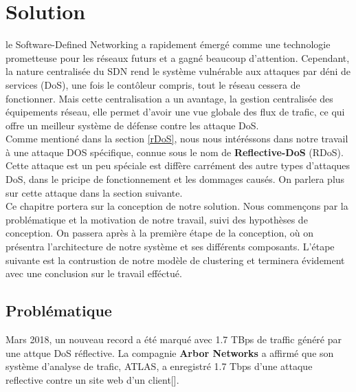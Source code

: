 \chapter{Solution}

\label{Chapter4} 
le Software-Defined Networking a rapidement émergé comme une technologie prometteuse pour les réseaux futurs et a gagné beaucoup d'attention. Cependant, la nature centralisée du SDN rend le système vulnérable aux attaques par déni de services (DoS), une fois le contôleur compris, tout le réseau cessera de fonctionner. Mais cette centralisation a un avantage, la gestion centralisée des équipements réseau, elle permet d'avoir une vue globale des flux de trafic, ce qui offre un meilleur système de défense contre les attaque DoS.\\

Comme mentioné dans la section \ref{rDoS}, nous nous intéréssons dans notre travail à une attaque DOS spécifique, connue sous le nom de \textbf{Reflective-DoS} (RDoS). Cette attaque est un peu spéciale est diffère carrément des autre types d'attaques DoS, dans le pricipe de fonctionnement et les dommages causés. On parlera plus sur cette attaque dans la section suivante. \\

Ce chapitre portera sur la conception de notre solution. Nous commençons par la problématique et la motivation de notre travail, suivi des hypothèses de conception. On passera après à la première étape de la conception, où on présentra l'architecture de notre système et ses différents composants. L'étape suivante est la contrustion de notre modèle de clustering  et terminera évidement avec une conclusion sur le travail efféctué.

\section{Problématique}
Mars 2018, un nouveau record a été marqué avec 1.7 TBps de traffic généré par une attque DoS réflective. La compagnie \textbf{Arbor Networks} a affirmé que son système d'analyse de trafic, ATLAS, a enregistré 1.7 Tbps d'une attaque reflective contre un site web d'un client[\cite{22}].\\

